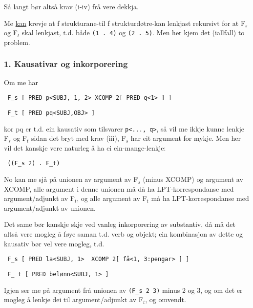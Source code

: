 \documentclass[11pt,a4paper,oneside,draft]{book}
\begin{document}
Så langt bør altså krav (i-iv) frå \citet{dyvik2009lmp} vere dekkja.

Me \underline{kan} krevje at f strukturane-til f strukturdøtre-kan lenkjast
rekursivt for at F$_s$ og F$_t$ skal lenkjast, t.d. både \texttt{(1 . 4)} og \texttt{(2 . 5)}. Men her kjem det (iallfall) to problem.


\subsubsection{1. Kausativar og inkorporering}
\label{sec-3.6.4.1}

Om me har 

\begin{verbatim}
 F_s [ PRED p<SUBJ, 1, 2> XCOMP 2[ PRED q<1> ] ]
\end{verbatim}


\begin{verbatim}
 F_t [ PRED pq<SUBJ,OBJ> ]
\end{verbatim}


kor pq er t.d. ein kausativ som tilsvarer \texttt{p<..., q>}, så vil me ikkje
kunne lenkje F$_s$ og F$_t$ sidan det bryt med krav (iii), F$_s$ har eit
argument for mykje. Men her vil det kanskje vere naturleg å ha ei
ein-mange-lenkje:

\begin{verbatim}
 ((F_s 2) . F_t)
\end{verbatim}


No kan me sjå på unionen av argument av F$_s$ (minus XCOMP) og argument
av XCOMP, alle argument i denne unionen må då ha LPT-korrespondanse
med argument/adjunkt av F$_t$, og alle argument av F$_t$ må ha
LPT-korrespondanse med argument/adjunkt av unionen.

Det same bør kanskje skje ved vanleg inkorporering av substantiv, då
må det altså vere mogleg å føye saman t.d. verb og objekt; ein
kombinasjon av dette og kausativ bør vel vere mogleg, t.d.

\begin{verbatim}
 F_s [ PRED la<SUBJ, 1>  XCOMP 2[ få<1, 3:pengar> ] ]
\end{verbatim}


\begin{verbatim}
 F_ t [ PRED belønn<SUBJ, 1> ]
\end{verbatim}


Igjen ser me på argument frå unionen av \texttt{(F\_s 2 3)} minus 2 og 3, og
om det er mogleg å lenkje dei til argument/adjunkt av F$_t$, og omvendt.
\end{document}
